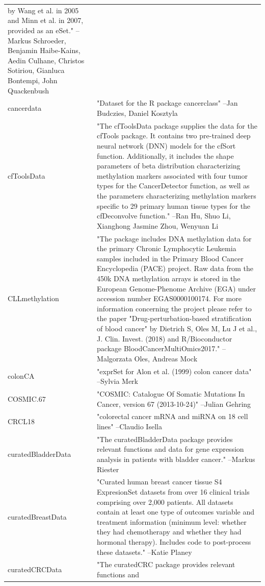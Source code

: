 \begin{longtable}[t]{l>{\raggedright\arraybackslash}p{25em}}
by Wang et al. in 2005 and Minn et al. in 2007, provided as an
eSet." --Markus Schroeder, Benjamin Haibe-Kains, Aedin Culhane, Christos Sotiriou, Gianluca Bontempi, John Quackenbush\\
cancerdata & "Dataset for the R package cancerclass" --Jan Budczies, Daniel Kosztyla\\
cfToolsData & "The cfToolsData package supplies the data for the cfTools
package. It contains two pre-trained deep neural network (DNN)
models for the cfSort function. Additionally, it includes the
shape parameters of beta distribution characterizing
methylation markers associated with four tumor types for the
CancerDetector function, as well as the parameters
characterizing methylation markers specific to 29 primary human
tissue types for the cfDeconvolve function." --Ran Hu, Shuo Li, Xianghong Jasmine Zhou, Wenyuan Li\\
\addlinespace
CLLmethylation & "The package includes DNA methylation data for the primary
Chronic Lymphocytic Leukemia samples included in the Primary
Blood Cancer Encyclopedia (PACE) project. Raw data from the
450k DNA methylation arrays is stored in the European
Genome-Phenome Archive (EGA) under accession number
EGAS0000100174. For more information concerning the project
please refer to the paper "Drug-perturbation-based
stratification of blood cancer" by Dietrich S, Oles M, Lu J et
al., J. Clin. Invest. (2018) and R/Bioconductor package
BloodCancerMultiOmics2017." --Malgorzata Oles, Andreas Mock\\
colonCA & "exprSet for Alon et al. (1999) colon cancer data" --Sylvia Merk\\
COSMIC.67 & "COSMIC: Catalogue Of Somatic Mutations In Cancer, version
67 (2013-10-24)" --Julian Gehring\\
CRCL18 & "colorectal cancer mRNA and miRNA on 18 cell lines" --Claudio Isella\\
curatedBladderData & "The curatedBladderData package provides relevant functions
and data for gene expression analysis in patients with bladder
cancer." --Markus Riester\\
\addlinespace
curatedBreastData & "Curated human breast cancer tissue S4 ExpresionSet
datasets from over 16 clinical trials comprising over 2,000
patients. All datasets contain at least one type of outcomes
variable and treatment information (minimum level: whether they
had chemotherapy and whether they had hormonal therapy).
Includes code to post-process these datasets." --Katie Planey\\
curatedCRCData & "The curatedCRC package provides relevant functions and

\end{longtable}
